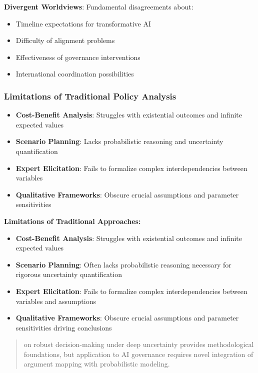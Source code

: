 \documentclass[
  11pt,
  letterpaper,
]{book}
\providecommand{\tightlist}{%
  \setlength{\itemsep}{0pt}\setlength{\parskip}{0pt}}
\begin{document}
\textbf{Divergent Worldviews}: Fundamental disagreements about:

\begin{itemize}
\tightlist
\item
  Timeline expectations for transformative AI
\item
  Difficulty of alignment problems
\item
  Effectiveness of governance interventions
\item
  International coordination possibilities
\end{itemize}

\subsubsection{Limitations of Traditional Policy
Analysis}\label{sec-traditional-limitations}

\begin{itemize}
\tightlist
\item
  \textbf{Cost-Benefit Analysis}: Struggles with existential outcomes
  and infinite expected values
\item
  \textbf{Scenario Planning}: Lacks probabilistic reasoning and
  uncertainty quantification
\item
  \textbf{Expert Elicitation}: Fails to formalize complex
  interdependencies between variables
\item
  \textbf{Qualitative Frameworks}: Obscure crucial assumptions and
  parameter sensitivities
\end{itemize}

\textbf{Limitations of Traditional Approaches:}

\begin{itemize}
\tightlist
\item
  \textbf{Cost-Benefit Analysis}: Struggles with existential outcomes
  and infinite expected values
\item
  \textbf{Scenario Planning}: Often lacks probabilistic reasoning
  necessary for rigorous uncertainty quantification
\item
  \textbf{Expert Elicitation}: Fails to formalize complex
  interdependencies between variables and assumptions
\item
  \textbf{Qualitative Frameworks}: Obscure crucial assumptions and
  parameter sensitivities driving conclusions
\end{itemize}

\begin{quote}
\textcite{lempert2003} on robust decision-making under deep uncertainty
provides methodological foundations, but application to AI governance
requires novel integration of argument mapping with probabilistic
modeling.
\end{quote}
\end{document}
